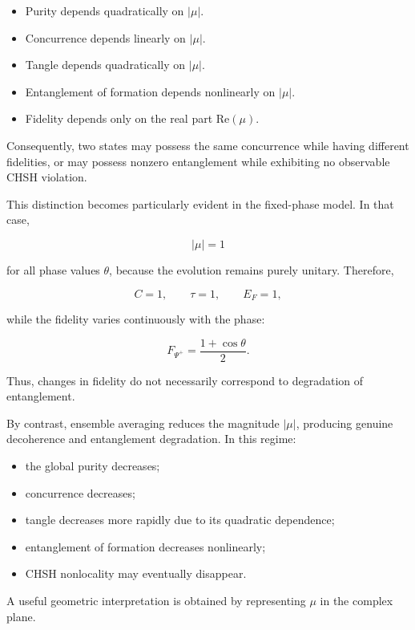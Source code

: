 \begin{itemize}
    \item Purity depends quadratically on \( |\mu| \).
    \item Concurrence depends linearly on \( |\mu| \).
    \item Tangle depends quadratically on \( |\mu| \).
    \item Entanglement of formation depends nonlinearly on \( |\mu| \).
    \item Fidelity depends only on the real part \( \mathrm{Re}(\mu) \).
\end{itemize}

\medskip

Consequently, two states may possess the same concurrence while having different fidelities, or may possess nonzero entanglement while exhibiting no observable CHSH violation.

\medskip

This distinction becomes particularly evident in the fixed-phase model. In that case,

\[
|\mu|
=
1
\]

for all phase values \( \theta \), because the evolution remains purely unitary. Therefore,

\[
C
=
1,
\qquad
\tau
=
1,
\qquad
E_F
=
1,
\]

while the fidelity varies continuously with the phase:

\[
F_{\Psi^+}
=
\frac{1+\cos\theta}{2}.
\]

Thus, changes in fidelity do not necessarily correspond to degradation of entanglement.

\medskip

By contrast, ensemble averaging reduces the magnitude \( |\mu| \), producing genuine decoherence and entanglement degradation. In this regime:

\begin{itemize}
    \item the global purity decreases;
    \item concurrence decreases;
    \item tangle decreases more rapidly due to its quadratic dependence;
    \item entanglement of formation decreases nonlinearly;
    \item CHSH nonlocality may eventually disappear.
\end{itemize}

\medskip

A useful geometric interpretation is obtained by representing \( \mu \) in the complex plane.

